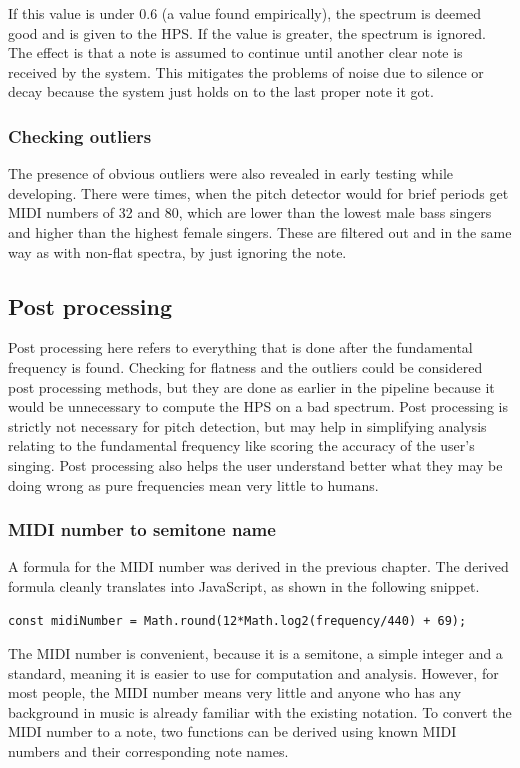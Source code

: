 If this value is under $0.6$ (a value found empirically), the spectrum is deemed good and is given to the HPS. If the value is greater, the spectrum is ignored. The effect is that a note is assumed to continue until another clear note is received by the system. This mitigates the problems of noise due to silence or decay because the system just holds on to the last proper note it got. 

\subsubsection{Checking outliers}
The presence of obvious outliers were also revealed in early testing while developing. There were times, when the pitch detector would for brief periods get MIDI numbers of 32 and 80, which are lower than the lowest male bass singers and higher than the highest female singers. These are filtered out and in the same way as with non-flat spectra, by just ignoring the note. 

\subsection{Post processing}
Post processing here refers to everything that is done after the fundamental frequency is found. Checking for flatness and the outliers could be considered post processing methods, but they are done as earlier in the pipeline because it would be unnecessary to compute the HPS on a bad spectrum. Post processing is strictly not necessary for pitch detection, but may help in simplifying analysis relating to the fundamental frequency like scoring the accuracy of the user's singing. Post processing also helps the user understand better what they may be doing wrong as pure frequencies mean very little to humans. 

\subsubsection{MIDI number to semitone name}
A formula for the MIDI number was derived in the previous chapter. The derived formula cleanly translates into JavaScript, as shown in the following snippet.

\begin{lstlisting}[style=javascript]
    const midiNumber = Math.round(12*Math.log2(frequency/440) + 69);
\end{lstlisting}

The MIDI number is convenient, because it is a semitone, a simple integer and a standard, meaning it is easier to use for computation and analysis. However, for most people, the MIDI number means very little and anyone who has any background in music is already familiar with the existing notation. To convert the MIDI number to a note, two functions can be derived using known MIDI numbers and their corresponding note names. 

